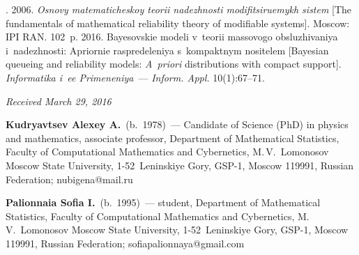 






  \begin{multicols}{2}

\renewcommand{\bibname}{\protect\rmfamily References}

{\small\frenchspacing
 {%
 \begin{thebibliography}{9}
. 2006. 
\textit{Osnovy ma\-te\-ma\-ti\-che\-skoy teorii nadezhnosti modifitsiruemykh sistem} 
[The fundamentals of mathematical reliability theory of modifiable systems]. Moscow: IPI RAN. 
102~p.
 2016. Bayesovskie modeli v~teorii massovogo obsluzhivaniya 
i~nadezhnosti: Apriornie raspredeleniya s~kompaktnym nositelem 
[Bayesian queueing and reliability models: \textit{A~priori} 
distributions with compact support]. 
\textit{Informatika i~ee Primeneniya}~--- \textit{Inform. Appl.} 10(1):67--71.

\end{thebibliography}

 }
 }

\end{multicols}

\vspace*{-3pt}

\hfill{\small\textit{Received March 29, 2016}}

\Contr

\noindent
\textbf{Kudryavtsev Alexey A.}\ (b.\ 1978)~---
Candidate of Science (PhD) in physics and mathematics, associate professor, 
Department of Mathematical Statistics, Faculty of Computational Mathematics 
and Cybernetics, M.\,V.~Lomonosov Moscow State University, 1-52~Leninskiye Gory, 
GSP-1, Moscow 119991, Russian Federation; nubigena@mail.ru

\vspace*{3pt}

 \noindent
 \textbf{Palionnaia Sofia I.}\ (b.\ 1995)~--- 
 student, Department of Mathematical Statistics, Faculty of Computational 
 Mathematics and Cybernetics, M.\,V.~Lomonosov Moscow State University, 1-52~Leninskiye 
 Gory, GSP-1, Moscow 119991, Russian Federation; sofiapalionnaya@gmail.com

 
\label{end\stat}


\renewcommand{\bibname}{\protect\rm Литература}